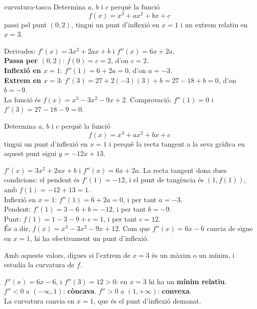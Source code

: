 \begin{apartats}

\begin{tria}{curvatura-tasca}
Determina $a$, $b$ i $c$ perquè la funció
\[
f(x)=x^3+ax^2+bx+c
\]
passi pel punt $(0,2)$, tingui un punt d'inflexió en $x=1$ i un extrem relatiu en $x=3$.

\begin{solucio}
Derivades: $f'(x)=3x^2+2ax+b$ i $f''(x)=6x+2a$.\\
\textbf{Passa per $(0,2)$}: $f(0)=c=2$, d'on $\boxed{c=2}$.\\
\textbf{Inflexió en $x=1$}: $f''(1)=6+2a=0$, d'on $\boxed{a=-3}$.\\
\textbf{Extrem en $x=3$}: $f'(3)=27+2(-3)(3)+b=27-18+b=0$, d'on $\boxed{b=-9}$.\\
La funció és $f(x)=x^3-3x^2-9x+2$. Comprovació: $f''(1)=0$ i $f'(3)=27-18-9=0$.
\end{solucio}

Determina $a$, $b$ i $c$ perquè la funció
\[
f(x)=x^3+ax^2+bx+c
\]
tingui un punt d'inflexió en $x=1$ i perquè la recta tangent a la seva gràfica en aquest punt
sigui $y=-12x+13$.

\begin{solucio}
$f'(x)=3x^2+2ax+b$ i $f''(x)=6x+2a$. La recta tangent dona dues condicions: el pendent és
$f'(1)=-12$, i el punt de tangència és $(1,f(1))$, amb $f(1)=-12+13=1$.\\
Inflexió en $x=1$: $f''(1)=6+2a=0$, i per tant $\boxed{a=-3}$.\\
Pendent: $f'(1)=3-6+b=-12$, i per tant $\boxed{b=-9}$.\\
Punt: $f(1)=1-3-9+c=1$, i per tant $\boxed{c=12}$.\\
És a dir, $f(x)=x^3-3x^2-9x+12$. Com que $f''(x)=6x-6$ canvia de signe en $x=1$, hi ha
efectivament un punt d'inflexió.
\end{solucio}
\end{tria}

\begin{nomesllarg}
Amb aquests valors, digues si l'extrem de $x=3$ és un màxim o un mínim, i estudia la curvatura
de $f$.

\begin{solucio}
$f''(x)=6x-6$, i $f''(3)=12>0$: en $x=3$ hi ha un \textbf{mínim relatiu}.\\
$f''<0$ a $(-\infty,1)$: \textbf{còncava}. \quad $f''>0$ a $(1,+\infty)$: \textbf{convexa}.\\
La curvatura canvia en $x=1$, que és el punt d'inflexió demanat.
\end{solucio}
\end{nomesllarg}

\end{apartats}
